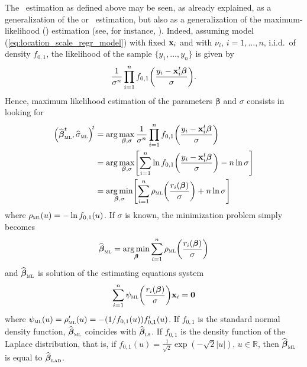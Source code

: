 The ~estimation as defined above may be seen, as already explained, as
a generalization of the  or ~estimation, but also as a
generalization of the maximum-likelihood () estimation (see, for
instance, \citealp{maronna:etal:2006}). Indeed, assuming model
(\ref{eq:location_scale_regr_model}) with fixed $\mathbf x_i$ and with
$\nu_i$, $i = 1, \dots, n$, i.i.d.\ of density $f_{0,1}$, the likelihood of
the sample $\{y_1, \dots, y_n\}$ is given by                                
\[
    \frac{1}{\sigma^{n}}\prod\limits_{i=1}^{n}
    f_{0,1}\left(\frac{y_i-\stvec{x}_i^t\boldsymbol\beta}{\sigma}\right).
\]
Hence, maximum likelihood estimation of the parameters $\boldsymbol\beta$
and $\sigma$ consists in looking for
%
\begin{align}
    \left(\sthat{\boldsymbol\beta}_{\stsc{ML}}^t,\sthat{\sigma}_{\stsc{ML}}\right)^{\!t}
    &= \arg\max_{\boldsymbol\beta,\sigma} \frac{1}{\sigma^{n}} \prod\limits_{i=1}^{n}
        f_{0,1}\left(\frac{y_i-\stvec{x}_i^t\boldsymbol\beta}{\sigma}\right)
    \nonumber\\
    &= \arg\max_{\boldsymbol\beta,\sigma} \left[\sum_{i=1}^{n}
        \ln f_{0,1}\left(\frac{y_i-\stvec{x}_i^t\boldsymbol\beta}{\sigma}\right) - n\ln\sigma\right]
    \nonumber\\
    & = \argmin_{\boldsymbol\beta,\sigma} \left[\sum_{i=1}^{n}
        \rho_{\stsc{ML}}\left(\frac{r_i(\boldsymbol\beta)}{\sigma}\right) + n\ln\sigma\right]
    \label{eq:ML_beta_sigma_min}
\end{align}
%
where $\rho_{\stsc{ML}}(u) = -\ln f_{0,1}(u)$. If $\sigma$ is known, the
minimization problem simply becomes
%
\begin{equation}\label{eq:ML_beta_min}
    \sthat{\boldsymbol\beta}_{\stsc{ML}} 
        = \argmin_{\boldsymbol\beta}\sum_{i=1}^{n} 
            \rho_{\stsc{ML}}\left(\frac{r_i(\boldsymbol\beta)}{\sigma}\right)
\end{equation}
%
and $\sthat{\boldsymbol\beta}_{\stsc{ML}}$ is solution of the estimating
equations system
\[
    \sum_{i=1}^{n} \psi_{\stsc{ML}}\left(\frac{r_i(\boldsymbol\beta)}{\sigma}\right) \stvec{x}_i = \stvec{0}
\]
where $\psi_{\stsc{ML}}(u) = \rho_{\stsc{ML}}'(u) = - (1/f_{0,1}(u))
f_{0,1}'(u)$. If $f_{0,1}$ is the standard normal density function,
$\sthat{\boldsymbol\beta}_{\stsc{ML}}$ coincides with
$\sthat{\boldsymbol\beta}_\stsc{LS}$. If $f_{0,1}$ is the density function of
the Laplace distribution, that is, if $f_{0,1}(u) =
\frac{1}{\sqrt{2}}\exp(-\sqrt{2}|u|)$, $u\in\mathbb{R}$, then
$\sthat{\boldsymbol\beta}_{\stsc{ML}}$ is equal to
$\sthat{\boldsymbol\beta}_{\stsc{LAD}}$.

